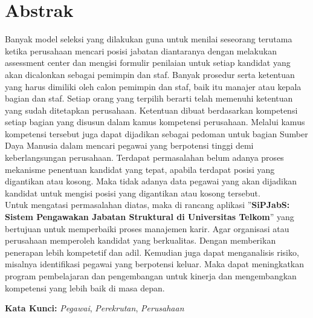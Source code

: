 
\chapter*{Abstrak}
\vspace*{0.7cm}

Banyak model seleksi yang dilakukan guna untuk menilai seseorang terutama ketika perusahaan mencari posisi jabatan diantaranya dengan melakukan assessment center dan mengisi formulir penilaian untuk setiap kandidat yang akan dicalonkan sebagai pemimpin dan staf. Banyak prosedur serta ketentuan yang harus dimiliki oleh calon pemimpin dan staf, baik itu manajer atau kepala bagian dan staf. Setiap orang yang terpilih berarti telah memenuhi ketentuan yang sudah ditetapkan perusahaan. Ketentuan dibuat berdasarkan kompetensi setiap bagian yang disusun dalam kamus kompetensi perusahaan. Melalui kamus kompetensi tersebut juga dapat dijadikan sebagai pedoman untuk bagian Sumber Daya Manusia dalam mencari pegawai yang berpotensi tinggi demi keberlangsungan perusahaan. Terdapat permasalahan belum adanya proses mekanisme penentuan kandidat yang tepat, apabila terdapat posisi yang digantikan atau kosong. Maka tidak adanya data pegawai yang akan dijadikan kandidat untuk mengisi posisi yang digantikan atau kosong tersebut.
\\

Untuk mengatasi permasalahan diatas, maka di rancang aplikasi ”\textbf{SiPJabS: Sistem Pengawakan Jabatan Struktural di Universitas Telkom}” yang bertujuan untuk memperbaiki proses manajemen karir. Agar organisasi atau perusahaan memperoleh kandidat yang berkualitas. Dengan memberikan penerapan lebih kompetetif dan adil. Kemudian juga dapat menganalisis risiko, misalnya identifikasi pegawai yang berpotensi keluar. Maka dapat meningkatkan program pembelajaran dan pengembangan untuk kinerja dan mengembangkan kompetensi yang lebih baik di masa depan. 

\vspace*{0.2cm}

\noindent \textbf{Kata Kunci:} \textit{Pegawai}, \textit{Perekrutan}, \textit{Perusahaan}\\ 

\newpage